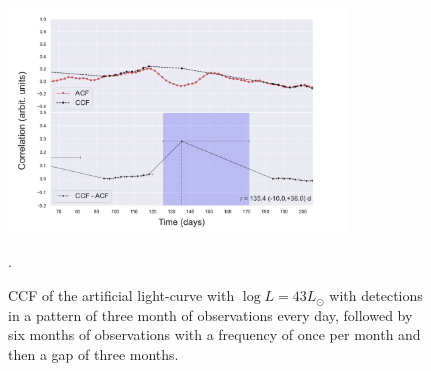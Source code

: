 \documentclass[letterpaper, oneside]{article}
\begin{document}
\begin{figure}[h]
	\centering
	\includegraphics[width=0.8\textwidth]{../CCF_plots/artificial_x_y_lgaps.pdf}
	\caption{CCF of the artificial light-curve with $\log L = 43 L_{\odot}$ with detections in a pattern of three month of observations every day, followed by six months of observations with a frequency of once per month and then a gap of three months.}.
	\label{fig:ccf_art_lc_L43_lgaps}
\end{figure}
\end{document}
